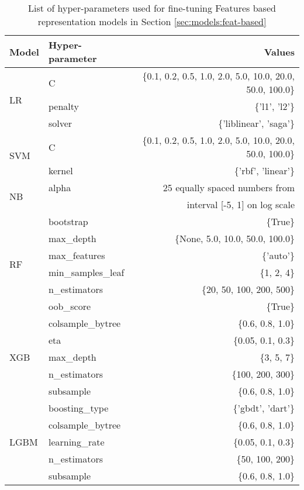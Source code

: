 \begin{table}[ht]
\centering
\begin{tabular}{llr}
\hline
\textbf{Model} & \textbf{Hyper-parameter} & \textbf{Values} \\
\hline
\multirow{3}{*}{LR} & C & \{0.1, 0.2, 0.5, 1.0, 2.0, 5.0, 10.0, 20.0, 50.0, 100.0\} \\
 & penalty & \{'l1', 'l2'\} \\
 & solver & \{'liblinear', 'saga'\} \\
\hline
\multirow{2}{*}{SVM} & C & \{0.1, 0.2, 0.5, 1.0, 2.0, 5.0, 10.0, 20.0, 50.0, 100.0\} \\
 & kernel & \{'rbf', 'linear'\} \\
\hline
\multirow{2}{*}{NB} & alpha & 25 equally spaced numbers from \\ & & interval {[}-5, 1{]} on log scale \\
\hline
\multirow{6}{*}{RF} & bootstrap & \{True\} \\
 & max\_depth & \{None, 5.0, 10.0, 50.0, 100.0\} \\
 & max\_features & \{'auto'\} \\
 & min\_samples\_leaf & \{1, 2, 4\} \\
 & n\_estimators & \{20, 50, 100, 200, 500\} \\
 & oob\_score & \{True\} \\
\hline
\multirow{5}{*}{XGB} & colsample\_bytree & \{0.6, 0.8, 1.0\} \\
 & eta & \{0.05, 0.1, 0.3\} \\
 & max\_depth & \{3, 5, 7\} \\
 & n\_estimators & \{100, 200, 300\} \\
 & subsample & \{0.6, 0.8, 1.0\} \\
\hline
\multirow{5}{*}{LGBM} & boosting\_type & \{'gbdt', 'dart'\} \\
 & colsample\_bytree & \{0.6, 0.8, 1.0\} \\
 & learning\_rate & \{0.05, 0.1, 0.3\} \\
 & n\_estimators & \{50, 100, 200\} \\
 & subsample & \{0.6, 0.8, 1.0\} \\
\hline
\end{tabular}
\caption{List of hyper-parameters used for fine-tuning Features based representation models in Section \ref{sec:models:feat-based}}
\label{tab:models:hparams-feat-based}
\end{table}



